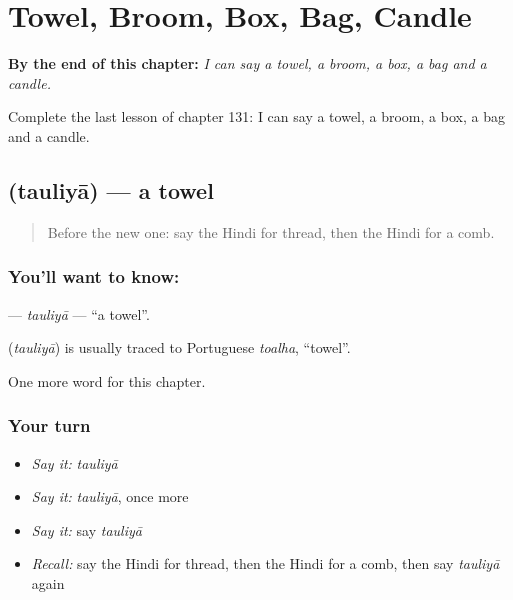 
\chapter{Towel, Broom, Box, Bag, Candle}
\label{ch:hi-towel-broom-box-bag-candle}

\begin{chapteropening}
\textbf{By the end of this chapter:} \emph{I can say a towel, a broom, a box, a bag and a candle.}

Complete the last lesson of chapter 131: I can say a towel, a broom, a box, a bag and a candle.
\end{chapteropening}

\section[\texorpdfstring{\hi{तौलिया} (tauliyā)}{तौलिया (tauliyā)}]{ (tauliyā) — a towel}

\label{lesson:HI-C131-tauliya}



\begin{quote}
Before the new one: say the Hindi for thread, then the Hindi for a comb.
\end{quote}

\subsection*{You'll want to know: }
\textbf{} — \emph{tauliyā} — \textquotedblleft{}a towel\textquotedblright{}.

\begin{cousinweb}
\textbf{} (\emph{tauliyā}) is usually traced to Portuguese \emph{toalha}, \textquotedblleft{}towel\textquotedblright{}.
\end{cousinweb}

\begin{grammarlens}[title={What you've built}]
One more word for this chapter.
\end{grammarlens}

\subsection*{Your turn}
\begin{itemize}
\raggedright
  \item \emph{Say it:} \emph{tauliyā}
  \item \emph{Say it:} \emph{tauliyā}, once more
  \item \emph{Say it:} say \emph{tauliyā}
  \item \emph{Recall:} say the Hindi for thread, then the Hindi for a comb, then say \emph{tauliyā} again
\end{itemize}

